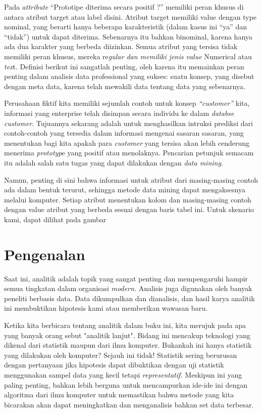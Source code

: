\par  Pada \textit{attribute} “Prototipe diterima secara positif ?” memiliki peran khusus di antara atribut target atau label disini. Atribut target memiliki value dengan type nominal, yang berarti hanya beberapa karakteristik (dalam kasus ini “ya” dan “tidak”) untuk dapat diterima. Sebenarnya itu bahkan binominal, karena hanya ada dua karakter yang berbeda diizinkan. Semua atribut yang tersisa tidak memiliki peran khusus, mereka re\textit{gular dan memiliki jenis value }Numerical atau\textit{ tex}t. Definisi berikut ini sangatlah penting, oleh karena itu memainkan peran penting dalam analisis data professional yang sukses: suatu konsep, yang disebut dengan meta data, karena telah mewakili data tentang data yang sebenarnya.
\par  Perusahaan fiktif kita memiliki sejumlah contoh untuk konsep \textit{“customer”} kita, informasi yang enterprise telah disimpan secara individu ke dalam \textit{databse customer}. Tujuannya sekarang adalah untuk menghasilkan intruksi prediksi dari contoh-contoh yang tersedia dalam informasi mengenai sasaran sasaran, yang menentukan bagi kita apakah para \textit{customer} yang tersisa akan lebih cenderung menerima \textit{prototyp}e yang positif atau menolaknya. Pencarian petunjuk semacam itu adalah salah satu tugas yang dapat dilakukan dengan \textit{data mining}.
\par Namun, penting di sini bahwa informasi untuk atribut dari masing-masing contoh ada dalam bentuk terurut, sehingga metode data mining dapat mengaksesnya melalui komputer. Setiap atribut menentukan kolom dan masing-masing contoh dengan value atribut yang berbeda sesuai dengan baris tabel ini. Untuk skenario kami, dapat dilihat pada gambar
 
\section{Pengenalan}

\par  Saat ini, analitik adalah topik yang sangat penting dan mempengaruhi hampir semua tingkatan dalam organisasi \textit{modern.} Analisis juga digunakan oleh banyak peneliti berbasis data. Data dikumpulkan dan dianalisis, dan hasil karya analitik ini membuktikan hipotesis kami atau memberikan wawasan baru.

\par Ketika kita berbicara tentang analitik dalam buku ini, kita merujuk pada apa yang banyak orang sebut "analitik lanjut". Bidang ini mencakup teknologi yang dikenal dari statistik maupun dari ilmu komputer. Bukankah ini hanya statistik yang dilakukan oleh komputer? Sejauh ini tidak! Statistik sering berurusan dengan pertanyaan jika hipotesis dapat dibuktikan dengan uji statistik menggunakan sampel data yang kecil tetapi \textit{representatif.} Meskipun ini yang paling penting, bahkan lebih berguna untuk mencampurkan ide-ide ini dengan algoritma dari ilmu komputer untuk memastikan bahwa metode yang kita bicarakan akan dapat meningkatkan dan menganalisis bahkan set data terbesar.


